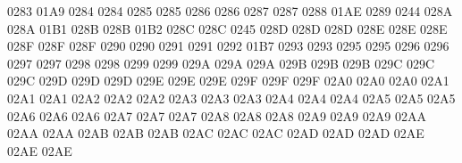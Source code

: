  0283 01A9 %
 0284 0284 %
 0285 0285 %
 0286 0286 %
 0287 0287 %
 0288 01AE %
 0289 0244 %
\setcclcucx 028A 028A 01B1 %
\setcclcucx 028B 028B 01B2 %
\setcclcucx 028C 028C 0245 %
\setcclcucx 028D 028D 028D %
\setcclcucx 028E 028E 028E %
\setcclcucx 028F 028F 028F %
 0290 0290 %
 0291 0291 %
 0292 01B7 %
 0293 0293 %
 0295 0295 %
 0296 0296 %
 0297 0297 %
 0298 0298 %
 0299 0299 %
\setcclcucx 029A 029A 029A %
\setcclcucx 029B 029B 029B %
\setcclcucx 029C 029C 029C %
\setcclcucx 029D 029D 029D %
\setcclcucx 029E 029E 029E %
\setcclcucx 029F 029F 029F %
\setcclcucx 02A0 02A0 02A0 %
\setcclcucx 02A1 02A1 02A1 %
\setcclcucx 02A2 02A2 02A2 %
\setcclcucx 02A3 02A3 02A3 %
\setcclcucx 02A4 02A4 02A4 %
\setcclcucx 02A5 02A5 02A5 %
\setcclcucx 02A6 02A6 02A6 %
\setcclcucx 02A7 02A7 02A7 %
\setcclcucx 02A8 02A8 02A8 %
\setcclcucx 02A9 02A9 02A9 %
\setcclcucx 02AA 02AA 02AA %
\setcclcucx 02AB 02AB 02AB %
\setcclcucx 02AC 02AC 02AC %
\setcclcucx 02AD 02AD 02AD %
\setcclcucx 02AE 02AE 02AE %
